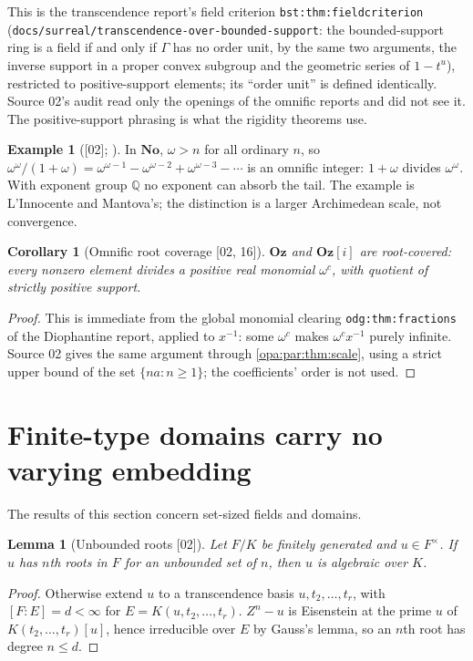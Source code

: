 \documentclass[11pt,oneside]{article}
\numberwithin{equation}{section}
\newtheorem{lemma}[lemma]{Lemma}
\newtheorem{corollary}[corollary]{Corollary}
\theoremstyle{definition}
\newtheorem{example}[example]{Example}
\theoremstyle{remark}
\newcommand{\No}{\mathbf{No}}
\newcommand{\Oz}{\mathbf{Oz}}
\newcommand{\Og}{\mathbf{Oz}[i]}
\newcommand{\Q}{\mathbb Q}
\newcommand{\src}[1]{\textup{\textsf{\small[#1]}}}
\newcommand{\lbl}[1]{\nolinkurl{#1}}
\newcommand{\fn}[1]{\nolinkurl{#1}}
\begin{document}
This is the transcendence report's field criterion \lbl{bst:thm:fieldcriterion}
(\fn{docs/surreal/transcendence-over-bounded-support}: the bounded-support ring is a
field if and only if $\Gamma$ has no order unit, by the same two arguments, the
inverse support in a proper convex subgroup and the geometric series of $1-t^u$),
restricted to positive-support elements; its ``order unit'' is defined identically.
Source 02's audit read only the openings of the omnific reports and did not see
it. The positive-support phrasing is what the rigidity theorems use.

\begin{example}[\src{02}; \cite{LM}]\label{opa:par:ex:omega}
In $\No$, $\omega>n$ for all ordinary $n$, so
$\omega^\omega/(1+\omega)=\omega^{\omega-1}-\omega^{\omega-2}+\omega^{\omega-3}-\cdots$ is an
omnific integer: $1+\omega$ divides $\omega^\omega$. With exponent group $\Q$ no exponent
can absorb the tail. The example is L'Innocente and Mantova's; the distinction is
a larger Archimedean scale, not convergence.
\end{example}

\begin{corollary}[Omnific root coverage \src{02, 16}]\label{opa:par:cor:ozcover}
$\Oz$ and $\Og$ are root-covered: every nonzero element divides a positive real
monomial $\omega^c$, with quotient of strictly positive support.
\end{corollary}
\begin{proof}
This is immediate from the global monomial clearing \lbl{odg:thm:fractions} of the
Diophantine report, applied to $x^{-1}$: some $\omega^c$ makes $\omega^cx^{-1}$ purely
infinite. Source 02 gives the same argument through \cref{opa:par:thm:scale}, using
a strict upper bound of the set $\{na:n\ge1\}$; the coefficients' order is not used.
\end{proof}

\section{Finite-type domains carry no varying embedding}\label{opa:par:sec:finitetype}

The results of this section concern set-sized fields and domains.

\begin{lemma}[Unbounded roots \src{02}]\label{opa:par:lem:rootsfield}
Let $F/K$ be finitely generated and $u\in F^\times$. If $u$ has $n$th roots in $F$ for
an unbounded set of $n$, then $u$ is algebraic over $K$.
\end{lemma}
\begin{proof}
Otherwise extend $u$ to a transcendence basis $u,t_2,\dots,t_r$, with
$[F:E]=d<\infty$ for $E=K(u,t_2,\dots,t_r)$. $Z^n-u$ is Eisenstein at the prime $u$ of
$K(t_2,\dots,t_r)[u]$, hence irreducible over $E$ by Gauss's lemma, so an $n$th root
has degree $n\le d$.
\end{proof}
\end{document}
